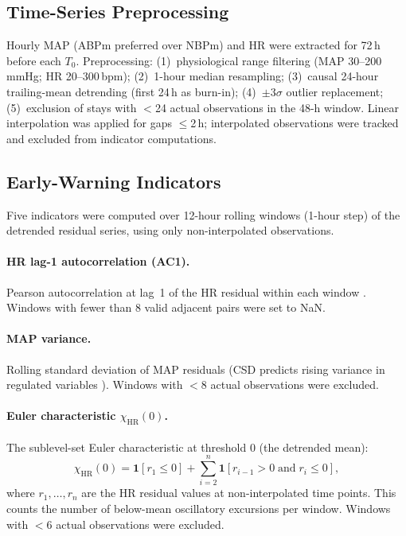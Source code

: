 \documentclass[12pt,a4paper]{article}
\newcommand{\Tzero}{$T_0$}
\begin{document}
\subsection{Time-Series Preprocessing}
\label{sec:preproc}

Hourly MAP (ABPm preferred over NBPm) and HR were extracted for
72\,h before each \Tzero.
Preprocessing: (1)~physiological range filtering (MAP 30--200\,mmHg;
HR 20--300\,bpm); (2)~1-hour median resampling; (3)~causal 24-hour
trailing-mean detrending (first 24\,h as burn-in); (4)~$\pm3\sigma$
outlier replacement; (5)~exclusion of stays with $<$24 actual observations
in the 48-h window.
Linear interpolation was applied for gaps $\leq$2\,h; interpolated
observations were tracked and excluded from indicator computations.

\subsection{Early-Warning Indicators}
\label{sec:indicators}

Five indicators were computed over 12-hour rolling windows (1-hour step)
of the detrended residual series, using only non-interpolated observations.

\paragraph{HR lag-1 autocorrelation (AC1).}
Pearson autocorrelation at lag~1 of the HR residual within each window
\citep{scheffer2009}.
Windows with fewer than 8 valid adjacent pairs were set to NaN.

\paragraph{MAP variance.}
Rolling standard deviation of MAP residuals
(CSD predicts rising variance in regulated variables \citep{rector2021}).
Windows with $<$8 actual observations were excluded.

\paragraph{Euler characteristic $\chi_{\text{HR}}(0)$.}
The sublevel-set Euler characteristic at threshold 0 (the detrended mean):
\begin{equation}
  \chi_{\text{HR}}(0)
  = \mathbf{1}[r_1 \leq 0]
    + \sum_{i=2}^{n} \mathbf{1}[r_{i-1} > 0 \;\text{and}\; r_i \leq 0],
  \label{eq:euler}
\end{equation}
where $r_1, \ldots, r_n$ are the HR residual values at non-interpolated
time points.
This counts the number of below-mean oscillatory excursions per window.
Windows with $<$6 actual observations were excluded.
\end{document}

